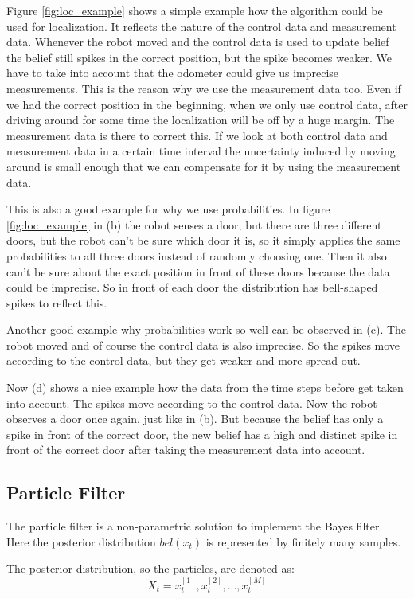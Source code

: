 Figure \ref{fig:loc_example} shows a simple example how the algorithm could be used for localization. It reflects the nature of the control data and measurement data. Whenever the robot moved and the control data is used to update belief the belief still spikes in the correct position, but the spike becomes weaker. We have to take into account that the odometer could give us imprecise measurements. This is the reason why we use the measurement data too. Even if we had the correct position in the beginning, when we only use control data, after driving around for some time the localization will be off by a huge margin. The measurement data is there to correct this. If we look at both control data and measurement data in a certain time interval the uncertainty induced by moving around is small enough that we can compensate for it by using the measurement data. 

This is also a good example for why we use probabilities. In figure \ref{fig:loc_example} in (b) the robot senses a door, but there are three different doors, but the robot can't be sure which door it is, so it simply applies the same probabilities to all three doors instead of randomly choosing one. Then it also can't be sure about the exact position in front of these doors because the data could be imprecise. So in front of each door the distribution has bell-shaped spikes to reflect this. 

Another good example why probabilities work so well can be observed in (c). The robot moved and of course the control data is also imprecise. So the spikes move according to the control data, but they get weaker and more spread out.

Now (d) shows a nice example how the data from the time steps before get taken into account. The spikes move according to the control data. Now the robot observes a door once again, just like in (b). But because the belief has only a spike in front of the correct door, the new belief has a high and distinct spike in front of the correct door after taking the measurement data into account.
\subsection{Particle Filter}
The particle filter is a non-parametric solution to implement the Bayes filter.  Here the posterior distribution $bel(x_t)$ is represented by finitely many samples. \cite[p. 85]{Thrun:2005:PR:1121596}

The posterior distribution, so the particles, are denoted as:
\begin{equation}
X_t = x_t^{[1]},x_t^{[2]},...,x_t^{[M]}
\end{equation}

